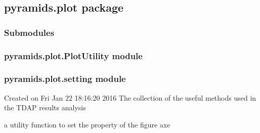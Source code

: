 \documentclass[letterpaper,10pt,english]{sphinxmanual}
\begin{document}
\subsection{pyramids.plot package}
\label{pyramids.plot::doc}\label{pyramids.plot:pyramids-plot-package}

\subsubsection{Submodules}
\label{pyramids.plot:submodules}

\subsubsection{pyramids.plot.PlotUtility module}
\label{pyramids.plot:pyramids-plot-plotutility-module}

\subsubsection{pyramids.plot.setting module}
\label{pyramids.plot:pyramids-plot-setting-module}\label{pyramids.plot:module-pyramids.plot.setting}
Created on Fri Jan 22 18:16:20 2016
The collection of the useful methods used in the TDAP results analysis

\begin{fulllineitems}
\label{pyramids.plot:pyramids.plot.setting.getColors}
\end{fulllineitems}


\begin{fulllineitems}
\label{pyramids.plot:pyramids.plot.setting.getPropertyFromPosition}
a utility function to set the property of the figure axe

\end{fulllineitems}

\end{document}
